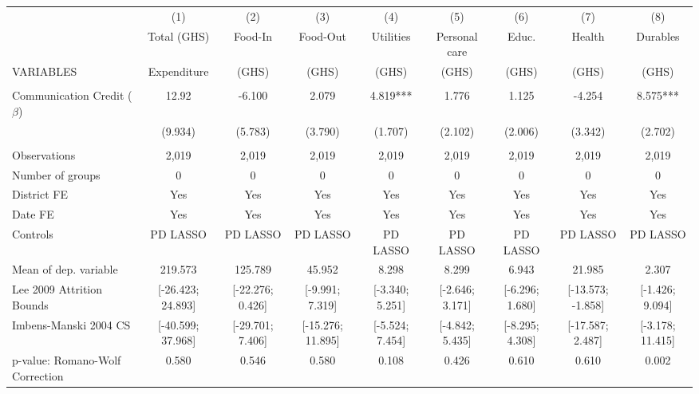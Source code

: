 \begin{tabular}{lcccccccc} \hline
 & (1) & (2) & (3) & (4) & (5) & (6) & (7) & (8) \\
 & Total (GHS) & Food-In & Food-Out & Utilities & Personal care & Educ. & Health & Durables \\
VARIABLES & Expenditure & (GHS) & (GHS) & (GHS) & (GHS) & (GHS) & (GHS) & (GHS) \\ \hline
 &  &  &  &  &  &  &  &  \\
Communication Credit ($\beta$) & 12.92 & -6.100 & 2.079 & 4.819*** & 1.776 & 1.125 & -4.254 & 8.575*** \\
 & (9.934) & (5.783) & (3.790) & (1.707) & (2.102) & (2.006) & (3.342) & (2.702) \\
 &  &  &  &  &  &  &  &  \\
Observations & 2,019 & 2,019 & 2,019 & 2,019 & 2,019 & 2,019 & 2,019 & 2,019 \\
Number of groups & 0 & 0 & 0 & 0 & 0 & 0 & 0 & 0 \\
District FE & Yes & Yes & Yes & Yes & Yes & Yes & Yes & Yes \\
Date FE & Yes & Yes & Yes & Yes & Yes & Yes & Yes & Yes \\
Controls & PD LASSO & PD LASSO & PD LASSO & PD LASSO & PD LASSO & PD LASSO & PD LASSO & PD LASSO \\
Mean of dep. variable & 219.573 & 125.789 & 45.952 & 8.298 & 8.299 & 6.943 & 21.985 & 2.307 \\
Lee 2009 Attrition Bounds & [-26.423; 24.893] & [-22.276; 0.426] & [-9.991; 7.319] & [-3.340; 5.251] & [-2.646; 3.171] & [-6.296; 1.680] & [-13.573; -1.858] & [-1.426; 9.094] \\
Imbens-Manski 2004 CS & [-40.599; 37.968] & [-29.701; 7.406] & [-15.276; 11.895] & [-5.524; 7.454] & [-4.842; 5.435] & [-8.295; 4.308] & [-17.587; 2.487] & [-3.178; 11.415] \\
 p-value: Romano-Wolf Correction & 0.580 & 0.546 & 0.580 & 0.108 & 0.426 & 0.610 & 0.610 & 0.002 \\ \hline
\end{tabular}
